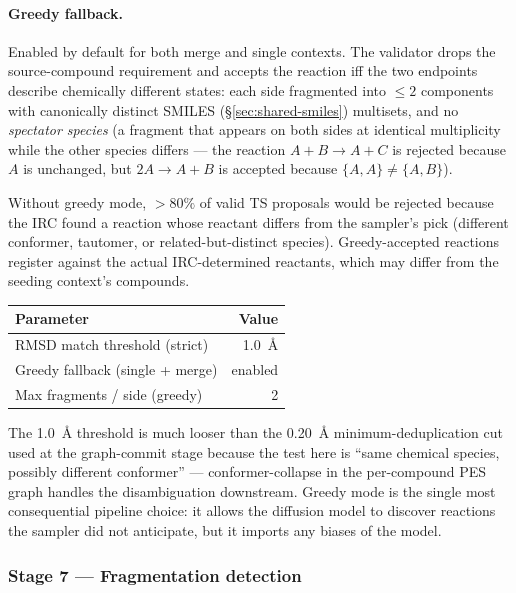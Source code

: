\paragraph{Greedy fallback.}
Enabled by default for both merge and single contexts. The validator drops the source-compound requirement and accepts the reaction iff the two endpoints describe chemically different states: each side fragmented into $\leq 2$ components with canonically distinct SMILES (\S\ref{sec:shared-smiles}) multisets, and no \emph{spectator species} (a fragment that appears on both sides at identical multiplicity while the other species differs --- the reaction $A + B \to A + C$ is rejected because $A$ is unchanged, but $2A \to A + B$ is accepted because $\{A,A\} \neq \{A,B\}$).

Without greedy mode, $> 80\%$ of valid TS proposals would be rejected because the IRC found a reaction whose reactant differs from the sampler's pick (different conformer, tautomer, or related-but-distinct species). Greedy-accepted reactions register against the actual IRC-determined reactants, which may differ from the seeding context's compounds.

\noindent\begin{tabular}{lr}
\toprule
Parameter & Value \\
\midrule
RMSD match threshold (strict) & \SI{1.0}{\angstrom} \\
Greedy fallback (single + merge) & enabled \\
Max fragments / side (greedy) & 2 \\
\bottomrule
\end{tabular}

The \SI{1.0}{\angstrom} threshold is much looser than the \SI{0.20}{\angstrom} minimum-deduplication cut used at the graph-commit stage because the test here is ``same chemical species, possibly different conformer'' --- conformer-collapse in the per-compound PES graph handles the disambiguation downstream. Greedy mode is the single most consequential pipeline choice: it allows the diffusion model to discover reactions the sampler did not anticipate, but it imports any biases of the model.


\subsubsection{Stage 7 --- Fragmentation detection}
\label{sec:fragmentation}

